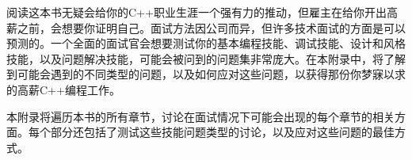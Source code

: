 阅读这本书无疑会给你的C++职业生涯一个强有力的推动，但雇主在给你开出高薪之前，会想要你证明自己。面试方法因公司而异，但许多技术面试的方面是可以预测的。一个全面的面试官会想要测试你的基本编程技能、调试技能、设计和风格技能，以及问题解决技能，可能会被问到的问题集非常庞大。在本附录中，将了解到可能会遇到的不同类型的问题，以及如何应对这些问题，以获得那份你梦寐以求的高薪C++编程工作。

本附录将遍历本书的所有章节，讨论在面试情况下可能会出现的每个章节的相关方面。每个部分还包括了测试这些技能问题类型的讨论，以及应对这些问题的最佳方式。
